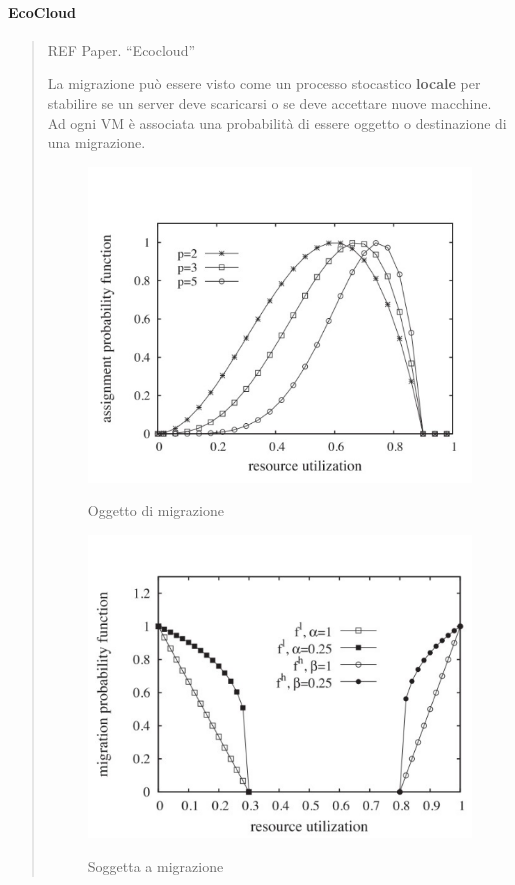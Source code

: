 \documentclass{article}
\begin{document}
		\paragraph{EcoCloud}
		\begin{quote}
		REF Paper. ``Ecocloud''
		
		La migrazione può essere visto come un processo stocastico \textbf{locale} per stabilire se un server deve scaricarsi o se deve accettare nuove macchine. Ad
		ogni VM è associata una probabilità di essere
		oggetto o destinazione di una
		migrazione.
		
		\begin{figure}[ht]
			\centering
			\begin{minipage}{0.5\textwidth}
				\centering
				\includegraphics[width=0.7\linewidth]{SAC_B8_ecocloud}
				\label{fig:sacb8ecocloud}
				\caption{Oggetto di migrazione}
			\end{minipage}\hfill
			\begin{minipage}{0.5\textwidth}
				\centering
				\includegraphics[width=0.7\linewidth]{images/SAC_B8_ecocloud2}
				\label{fig:sacb8ecocloud2}
				\caption{Soggetta a migrazione}
			\end{minipage}
		\end{figure}
		

\end{quote}
\end{document}
